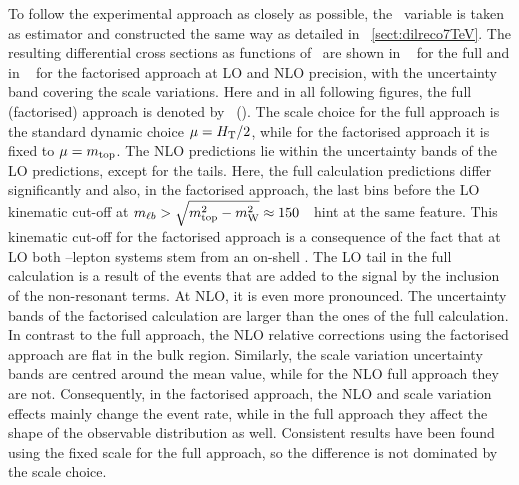 To follow the experimental approach as closely as possible, the \mlb\ variable is taken as estimator and constructed the same way as detailed in \sect~\ref{sect:dilreco7TeV}. 
%
The resulting differential cross sections as functions of \mlb\ are shown in \fig~ for the full and in \fig~ for the factorised approach at \gls{LO} and \gls{NLO} precision, with the uncertainty band covering the scale variations. 
%
Here and in all following figures, the full (factorised) approach is denoted by \WWbbplusminus\ (\ttbar).
%
The scale choice for the full approach is the standard dynamic choice $\mu=H_{\mathrm{T}}/2$, while for the factorised approach it is fixed to $\mu=m_{\mathrm{top}}$. 
%
The \gls{NLO} predictions lie within the uncertainty bands of the \gls{LO} predictions, except for the tails. Here, the full calculation predictions differ significantly and also, in the factorised approach, the last bins before the \gls{LO} kinematic cut-off at $m_{\ell b} > \sqrt{m_{\mathrm{top}}^2-m_{\mathrm{W}}^2} \approx 150$~\GeV\ hint at the same feature. This kinematic cut-off for the factorised approach is a consequence of the fact that at \gls{LO} both \bquark--lepton systems stem from an on-shell \tquark. 
%
The \gls{LO} tail in the full calculation is a result of the events that are added to the signal by the inclusion of the non-resonant terms. At \gls{NLO}, it is even more pronounced.
%
%
The uncertainty bands of the factorised calculation are larger than the ones of the full calculation. In contrast to the full approach, the \gls{NLO} relative corrections using the factorised approach are flat in the bulk region. Similarly, the scale variation uncertainty bands are centred around the mean value, while for the \gls{NLO} full approach they are not. Consequently, in the factorised approach, the \gls{NLO} and scale variation effects mainly change the event rate, while in the full approach they affect the shape of the observable distribution as well. 
%
Consistent results have been found using the fixed scale for the full approach, so the difference is not dominated by the scale choice.
%
